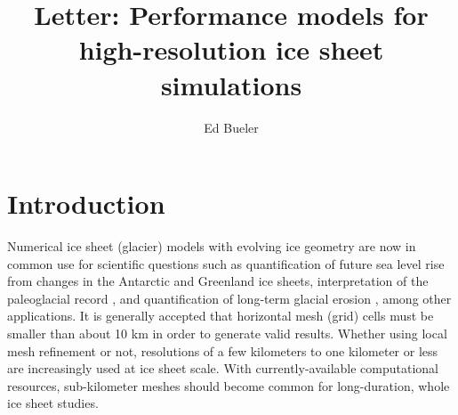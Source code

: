 \documentclass[twocolumn,letterpaper]{igs}
\begin{document}
\title[Performance models for high-resolution ice sheet simulations]{Letter: Performance models for \\ high-resolution ice sheet simulations}


\author{Ed Bueler}



\maketitle

\sectionsize

\section{Introduction}

Numerical ice sheet (glacier) models with evolving ice geometry are now in common use for scientific questions such as quantification of future sea level rise from changes in the Antarctic \citep{Seroussietal2020} and Greenland \citep{Goelzeretal2020} ice sheets, interpretation of the paleoglacial record \citep{Weberetal2021}, and quantification of long-term glacial erosion \citep{SeguinotDelaney2021}, among other applications.  It is generally accepted that horizontal mesh (grid) cells must be smaller than about 10 km in order to generate valid results.  Whether using local mesh refinement \citep[for example]{Hoffmanetal2018} or not, resolutions of a few kilometers to one kilometer \citep{SeguinotDelaney2021} or less \citep{Aschwandenetal2019} are increasingly used at ice sheet scale.  With currently-available computational resources, sub-kilometer meshes should become common for long-duration, whole ice sheet studies.
\end{document}
